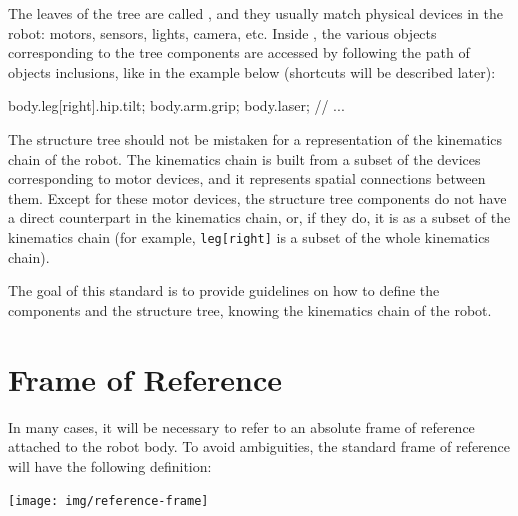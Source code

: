 The leaves of the tree are called , and they usually match
physical devices in the robot: motors, sensors, lights, camera, etc. Inside
\urbi, the various objects corresponding to the tree components are accessed
by following the path of objects inclusions, like in the example below
(shortcuts will be described later):

\begin{urbiunchecked}
body.leg[right].hip.tilt;
body.arm.grip;
body.laser;
// ...
\end{urbiunchecked}


The structure tree should not be mistaken for a representation of the
kinematics chain of the robot. The kinematics chain is built from a subset
of the devices corresponding to motor devices, and it represents spatial
connections between them. Except for these motor devices, the structure tree
components do not have a direct counterpart in the kinematics chain, or, if
they do, it is as a subset of the kinematics chain (for example,
\lstinline{leg[right]} is a subset of the whole kinematics chain).


The goal of this standard is to provide guidelines on how to define
the components and the structure tree, knowing the kinematics chain of
the robot.

\section{Frame of Reference}

In many cases, it will be necessary to refer to an absolute frame of
reference attached to the robot body. To avoid ambiguities, the
standard frame of reference will have the following definition:

\begin{center}
  \texttt{[image: img/reference-frame]}
\end{center}

